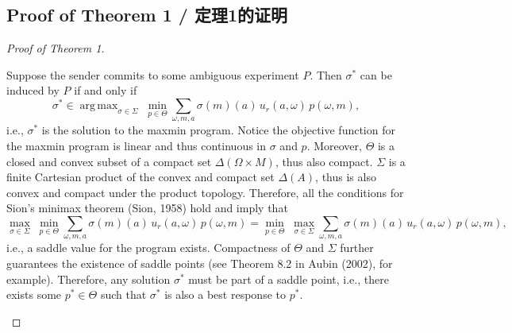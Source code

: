 \documentclass[12pt,a4paper]{article}
\theoremstyle{definition}
\theoremstyle{remark}
\newenvironment{original}{%
    \par\medskip\noindent%
    \begin{tcolorbox}[%
        colback=white,%
        colframe=black!50,%
        title=\textbf{Original English},%
        fonttitle=\small\bfseries,%
        left=0pt, right=0pt, top=2pt, bottom=2pt,%
        boxrule=0.5pt,%
        arc=0pt,%
        outer arc=0pt%
    ]%
    \small%
}{%
    \end{tcolorbox}%
}
\DeclareMathOperator{\argmax}{arg\,max}
\begin{document}
\subsection{Proof of Theorem 1 / 定理1的证明}

\begin{proof}[Proof of Theorem 1]
\begin{original}
Suppose the sender commits to some ambiguous experiment $P$. Then $\sigma^*$ can be induced by $P$ if and only if
\[
\sigma^* \in \argmax_{\sigma \in \Sigma} \; \min_{p \in \Theta} \sum_{\omega, m, a} \sigma(m)(a) \, u_r(a, \omega) \, p(\omega, m),
\]
i.e., $\sigma^*$ is the solution to the maxmin program. Notice the objective function for the maxmin program is linear and thus continuous in $\sigma$ and $p$. Moreover, $\Theta$ is a closed and convex subset of a compact set $\Delta(\Omega \times M)$, thus also compact. $\Sigma$ is a finite Cartesian product of the convex and compact set $\Delta(A)$, thus is also convex and compact under the product topology. Therefore, all the conditions for Sion's minimax theorem (Sion, 1958) hold and imply that
\[
\max_{\sigma \in \Sigma} \; \min_{p \in \Theta} \sum_{\omega, m, a} \sigma(m)(a) \, u_r(a, \omega) \, p(\omega, m)
= \min_{p \in \Theta} \; \max_{\sigma \in \Sigma} \sum_{\omega, m, a} \sigma(m)(a) \, u_r(a, \omega) \, p(\omega, m),
\]
i.e., a saddle value for the program exists. Compactness of $\Theta$ and $\Sigma$ further guarantees the existence of saddle points (see Theorem 8.2 in Aubin (2002), for example). Therefore, any solution $\sigma^*$ must be part of a saddle point, i.e., there exists some $p^* \in \Theta$ such that $\sigma^*$ is also a best response to $p^*$.


\end{original}
\end{proof}
\end{document}
